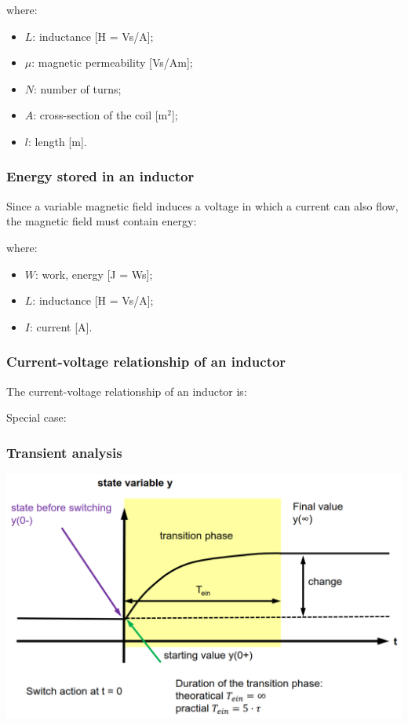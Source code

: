 \documentclass{article}
\begin{document}
where:
\begin{itemize}
    \item $L$: inductance [H = Vs/A];
    \item $\mu$: magnetic permeability [Vs/Am];
    \item $N$: number of turns;
    \item $A$: cross-section of the coil [m$^2$];
    \item $l$: length [m].
\end{itemize}

\subsubsection{Energy stored in an inductor}
Since a variable magnetic field induces a voltage in which a current can also flow, the magnetic field must contain
energy:


where:
\begin{itemize}
    \item $W$: work, energy [J = Ws];
    \item $L$: inductance [H = Vs/A];
    \item $I$: current [A].
\end{itemize}

\newpage
\subsubsection{Current-voltage relationship of an inductor}
The current-voltage relationship of an inductor is:

Special case:

\subsubsection{Transient analysis}
\begin{center}
    \includegraphics[width=.8\textwidth]{media/transient_analysis.png}
\end{center}
\end{document}

